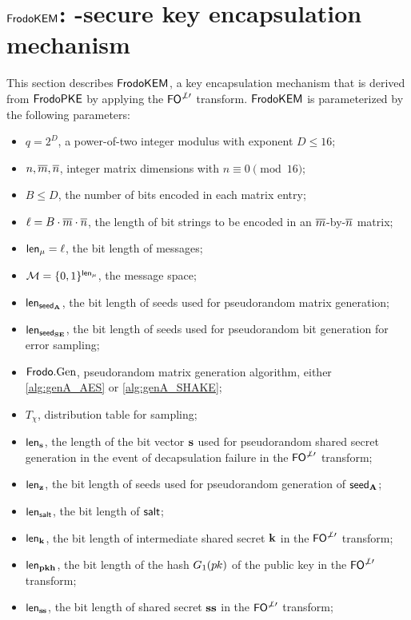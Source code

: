 \documentclass{iacrcc}
\begin{document}
\section{$\textsf{\upshape\mdseries FrodoKEM}$: \INDCCA-secure key encapsulation mechanism}\label{sec:cca-kem}

This section describes $\textsf{\upshape\mdseries FrodoKEM}$, a key encapsulation mechanism that is derived from $\textsf{\upshape\mdseries FrodoPKE}$ by applying the $\textsf{\upshape\mdseries FO}^{\not\perp\prime}$ transform.  $\textsf{\upshape\mdseries FrodoKEM}$ is parameterized by the following parameters:
\begin{itemize}
\item $q=2^D$, a power-of-two integer modulus with exponent $D \leq 16$;
\item $n, \overline{m}, \overline{n}$, integer matrix dimensions with $n \equiv 0 \pmod {16}$;
\item $B \le D$, the number of bits encoded in each matrix entry;
\item $\ell=B\cdot \overline{m}\cdot\overline{n}$, the length of bit strings to be encoded in an $\overline{m}$-by-$\overline{n}$ matrix;
\item ${\mathsf{len}_{\mu}} = \ell$, the bit length of messages;
\item $\mathcal{M} = \{0,1\}^{\mathsf{len}_{\mu}}$, the message space;
\item ${\mathsf{len}_{{\mathsf{seed}_{\mathbf{A}}}}}$, the bit length of seeds used for pseudorandom matrix generation;
\item ${\mathsf{len}_{{\mathsf{seed}_{\mathbf{S}\mathbf{E}}}}}$, the bit length of seeds used for pseudorandom bit generation for error sampling;
\item $\textsf{\upshape\mdseries Frodo}.\textrm{\upshape\mdseries Gen}$, pseudorandom matrix generation algorithm, either \autoref{alg:genA_AES} or \autoref{alg:genA_SHAKE};
\item $T_\chi$, distribution table for sampling;
\item ${\mathsf{len}_{\mathbf{s}}}$, the length of the bit vector $\mathbf{s}$ used for pseudorandom shared secret generation in the event of decapsulation failure in the $\textsf{\upshape\mdseries FO}^{\not\perp\prime}$ transform;
\item ${\mathsf{len}_{\mathbf{z}}}$, the bit length of seeds used for pseudorandom generation of ${\mathsf{seed}_{\mathbf{A}}}$;
\item {\color{red}${\mathsf{len}_{{\mathsf{salt}}}}$, the bit length of ${\mathsf{salt}}$;}
\item ${\mathsf{len}_{\mathbf{k}}}$, the bit length of intermediate shared secret $\mathbf{k}$ in the $\textsf{\upshape\mdseries FO}^{\not\perp\prime}$ transform;
\item ${\mathsf{len}_{\mathbf{p}\mathbf{k}\mathbf{h}}}$, the bit length of the hash $G_1(p\mkern-0.5muk)$ of the public key in the $\textsf{\upshape\mdseries FO}^{\not\perp\prime}$ transform;
\item ${\mathsf{len}_{\mathbf{s}\mkern-1mu\mathbf{s}}}$, the bit length of shared secret $\mathbf{s}\mathbf{s}$ in the $\textsf{\upshape\mdseries FO}^{\not\perp\prime}$ transform;
\end{itemize}
\end{document}
